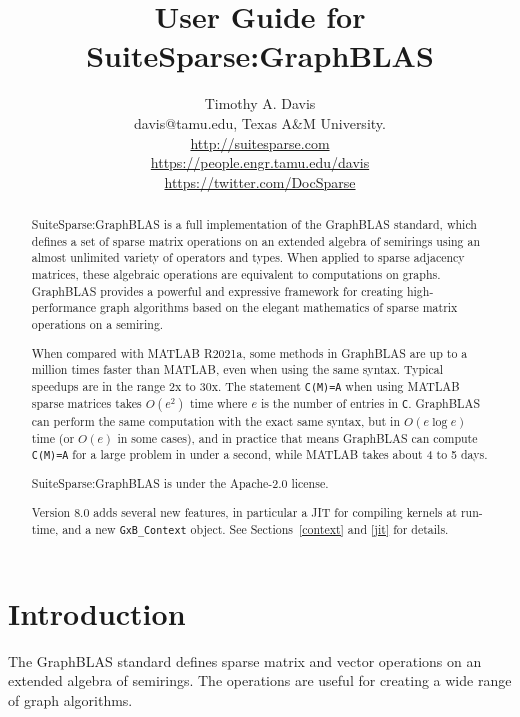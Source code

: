 \documentclass[12pt]{article}
\title{User Guide for SuiteSparse:GraphBLAS}
\author{Timothy A. Davis \\
\small
davis@tamu.edu, Texas A\&M University. \\
\small
\url{http://suitesparse.com} \\
\small
\url{https://people.engr.tamu.edu/davis} \\
\small
\url{https://twitter.com/DocSparse}
}
\begin{document}
\maketitle

\begin{abstract}
SuiteSparse:GraphBLAS is a full implementation of the GraphBLAS standard,
which defines a set of sparse matrix operations on an extended algebra of
semirings using an almost unlimited variety of operators and types.  When
applied to sparse adjacency matrices, these algebraic operations are equivalent
to computations on graphs.  GraphBLAS provides a powerful and expressive
framework for creating high-performance graph algorithms based on the elegant
mathematics of sparse matrix operations on a semiring.

When compared with MATLAB R2021a, some methods in GraphBLAS are up to
a million times faster than MATLAB, even when using the same syntax.
Typical speedups are in the range 2x to 30x.
The statement \verb'C(M)=A' when using MATLAB sparse matrices takes
$O(e^2)$ time where $e$ is the number of entries in \verb'C'.  GraphBLAS
can perform the same computation with the exact same syntax, but
in $O(e \log e)$ time (or $O(e)$ in some cases), and in practice that
means GraphBLAS can compute \verb'C(M)=A' for a large problem in under
a second, while MATLAB takes about 4 to 5 days.

SuiteSparse:GraphBLAS is under the Apache-2.0 license.

Version 8.0 adds several new features, in particular a JIT for compiling
kernels at run-time, and a new \verb'GxB_Context' object.
See Sections~\ref{context} and \ref{jit} for details.

\end{abstract}

\newpage
{\small
\tableofcontents
}

\newpage
\section{Introduction} %
\label{intro}

The GraphBLAS standard defines sparse matrix and vector operations on an
extended algebra of semirings.  The operations are useful for creating a wide
range of graph algorithms.
\end{document}
